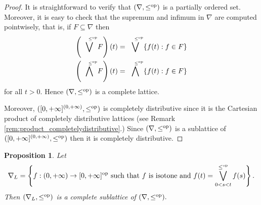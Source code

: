\documentclass[11pt,a4paper]{amsart}
\newtheorem{proposition}[theorem]{Proposition}
\theoremstyle{definition}
\begin{document}
	\begin{proof}
		
		It is straightforward to verify that $(\nabla,\leq^\text{\normalfont op})$ is a partially ordered set. Moreover, it is easy to check that the supremum and infimum in $\nabla$ are computed pointwisely, that is, if $F\subseteq\nabla$ then
		\begin{align*}
			\left(\overset{\quad{\scriptscriptstyle\leq^{\text{\normalfont op}}}}{\bigvee}  F\right)(t)&=\overset{\quad{\scriptscriptstyle\leq^{\text{\normalfont op}}}}{\bigvee} \{f(t):f\in F\}\\
			\left(\overset{\quad{\scriptscriptstyle\leq^{\text{\normalfont op}}}}{\bigwedge} F\right)(t)&=\overset{\quad{\scriptscriptstyle\leq^{\text{\normalfont op}}}}{\bigwedge} \{f(t):f\in F\}
		\end{align*}
		for all $t>0$. Hence $(\nabla,\leq^\text{\normalfont op})$ is a complete lattice.
		
		Moreover,  $([0,+\infty]^{(0,+\infty)},\leq^\text{\normalfont op})$ is completely distributive since it is the Cartesian product of completely distributive lattices (see Remark \ref{rem:product_completelydistributive}.) Since $(\nabla,\leq^\text{\normalfont op})$ is a sublattice of $([0,+\infty]^{(0,+\infty)},\leq^\text{\normalfont op})$ then it is completely distributive.
	\end{proof}
	
	
	
	
	\begin{proposition}
		Let
		$$\nabla_{L}=\left\{f:(0,+\infty)\to[0,+\infty]^\text{\normalfont op}\text{ such that } f\text{ is isotone} \text{ and } f(t)=\bigvee^{\leq^\text{\normalfont op}}_{0<s<t} f(s)\right\}.$$
		Then $(\nabla_L,\leq^\text{\normalfont op})$ is a complete sublattice of $(\nabla,\leq^\text{\normalfont op}).$
	\end{proposition}
	
	
	
\end{document}
